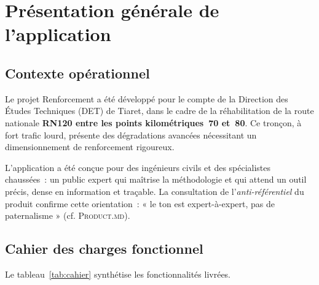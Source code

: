 \section{Présentation générale de l'application}
\label{sec:presentation}

\subsection{Contexte opérationnel}
\label{sec:contexte}

Le projet \cttp{} Renforcement a été développé pour le compte de la
Direction des Études Techniques (DET) de Tiaret, dans le cadre de la
réhabilitation de la route nationale \textbf{RN120 entre les points
kilométriques~70 et~80}. Ce tronçon, à fort trafic lourd, présente des
dégradations avancées nécessitant un dimensionnement de renforcement
rigoureux.

L'application a été conçue pour des ingénieurs civils et des
spécialistes chaussées~: un public expert qui maîtrise la méthodologie
\cttp{} et qui attend un outil précis, dense en information et
traçable. La consultation de l'\textit{anti-référentiel} du produit
confirme cette orientation~: « le ton est expert-à-expert, pas de
paternalisme » (cf. \textsc{Product.md}).

\subsection{Cahier des charges fonctionnel}
\label{sec:cahier-charges}

Le tableau~\ref{tab:cahier} synthétise les fonctionnalités livrées.

